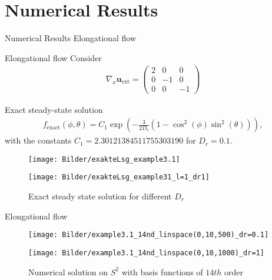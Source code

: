 \section{Numerical Results}

\begin{frame}{Numerical Results}
	\centering
	Elongational flow
\end{frame}


\begin{frame}{Elongational flow}
	\scriptsize
	Consider
	\begin{align*}
		\nabla_{x} \boldsymbol{u}_{\mathrm{ext}}=\left(\begin{array}{ccc}
			2 & 0 & 0 \\
			0 & -1 & 0 \\
			0 & 0 & -1
		\end{array}\right) %
	\end{align*}
	
	Exact steady-state solution
	\begin{align}
		f_{\text {exact}}(\phi, \theta)=C_1 \exp \left(-\frac{3}{2 D_{\mathrm{r}}}\left(1-\cos ^2(\phi) \sin ^2(\theta)\right)\right),
	\end{align}
	with the constants $C_1 = 2.30121384511755303190$ for $D_r=0.1$.
	
	\begin{figure}
		\begin{minipage}{0.4\textwidth}
			\texttt{[image: Bilder/exakteLsg\_example3.1]}
		\end{minipage}
		\hfill 
		\begin{minipage}{0.4\textwidth}
			\texttt{[image: Bilder/exakteLsg\_example31\_l=1\_dr1]}
		\end{minipage}
		\caption{Exact steady state solution for different $D_r$}
	\end{figure}
\end{frame}



\begin{frame}{Elongational flow}
	\begin{figure}
		\begin{minipage}{0.48\textwidth}
			\texttt{[image: Bilder/example3.1\_14nd\_linspace(0,10,500)\_dr=0.1]}
		\end{minipage}
		\hfill 
		\begin{minipage}{0.48\textwidth}
			\texttt{[image: Bilder/example3.1\_14nd\_linspace(0,10,1000)\_dr=1]}
		\end{minipage}
		\caption{Numerical solution on $S^2$ with basis functions of $14th$ order}
	\end{figure}
\end{frame}

